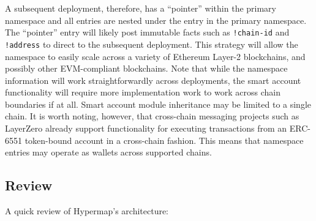 \documentclass[runningheads]{llncs}
\begin{document}
A subsequent deployment, therefore, has a ``pointer'' within the primary namespace and all entries are nested under the entry in the primary namespace.
The ``pointer'' entry will likely post immutable facts such as \verb|!chain-id| and \verb|!address| to direct to the subsequent deployment.
This strategy will allow the namespace to easily scale across a variety of Ethereum Layer-2 blockchains, and possibly other EVM-compliant blockchains.
Note that while the namespace information will work straightforwardly across deployments, the smart account functionality will require more implementation work to work across chain boundaries if at all.
Smart account module inheritance may be limited to a single chain.
It is worth noting, however, that cross-chain messaging projects such as LayerZero already support functionality for executing transactions from an ERC-6551 token-bound account in a cross-chain fashion.
This means that namespace entries may operate as wallets across supported chains.

\subsection{Review}
\label{sec:hypermapreview}

A quick review of Hypermap's architecture:
\end{document}
